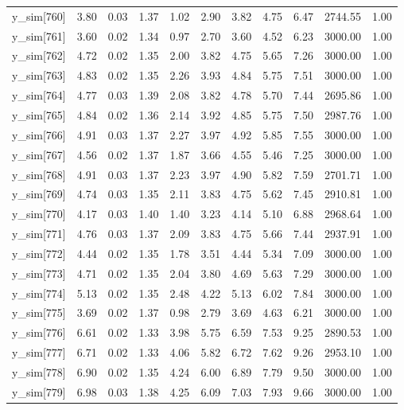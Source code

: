 \begin{table}[ht]
\begin{tabular}{rrrrrrrrrrr}
  y\_sim[760] & 3.80 & 0.03 & 1.37 & 1.02 & 2.90 & 3.82 & 4.75 & 6.47 & 2744.55 & 1.00 \\ 
  y\_sim[761] & 3.60 & 0.02 & 1.34 & 0.97 & 2.70 & 3.60 & 4.52 & 6.23 & 3000.00 & 1.00 \\ 
  y\_sim[762] & 4.72 & 0.02 & 1.35 & 2.00 & 3.82 & 4.75 & 5.65 & 7.26 & 3000.00 & 1.00 \\ 
  y\_sim[763] & 4.83 & 0.02 & 1.35 & 2.26 & 3.93 & 4.84 & 5.75 & 7.51 & 3000.00 & 1.00 \\ 
  y\_sim[764] & 4.77 & 0.03 & 1.39 & 2.08 & 3.82 & 4.78 & 5.70 & 7.44 & 2695.86 & 1.00 \\ 
  y\_sim[765] & 4.84 & 0.02 & 1.36 & 2.14 & 3.92 & 4.85 & 5.75 & 7.50 & 2987.76 & 1.00 \\ 
  y\_sim[766] & 4.91 & 0.03 & 1.37 & 2.27 & 3.97 & 4.92 & 5.85 & 7.55 & 3000.00 & 1.00 \\ 
  y\_sim[767] & 4.56 & 0.02 & 1.37 & 1.87 & 3.66 & 4.55 & 5.46 & 7.25 & 3000.00 & 1.00 \\ 
  y\_sim[768] & 4.91 & 0.03 & 1.37 & 2.23 & 3.97 & 4.90 & 5.82 & 7.59 & 2701.71 & 1.00 \\ 
  y\_sim[769] & 4.74 & 0.03 & 1.35 & 2.11 & 3.83 & 4.75 & 5.62 & 7.45 & 2910.81 & 1.00 \\ 
  y\_sim[770] & 4.17 & 0.03 & 1.40 & 1.40 & 3.23 & 4.14 & 5.10 & 6.88 & 2968.64 & 1.00 \\ 
  y\_sim[771] & 4.76 & 0.03 & 1.37 & 2.09 & 3.83 & 4.75 & 5.66 & 7.44 & 2937.91 & 1.00 \\ 
  y\_sim[772] & 4.44 & 0.02 & 1.35 & 1.78 & 3.51 & 4.44 & 5.34 & 7.09 & 3000.00 & 1.00 \\ 
  y\_sim[773] & 4.71 & 0.02 & 1.35 & 2.04 & 3.80 & 4.69 & 5.63 & 7.29 & 3000.00 & 1.00 \\ 
  y\_sim[774] & 5.13 & 0.02 & 1.35 & 2.48 & 4.22 & 5.13 & 6.02 & 7.84 & 3000.00 & 1.00 \\ 
  y\_sim[775] & 3.69 & 0.02 & 1.37 & 0.98 & 2.79 & 3.69 & 4.63 & 6.21 & 3000.00 & 1.00 \\ 
  y\_sim[776] & 6.61 & 0.02 & 1.33 & 3.98 & 5.75 & 6.59 & 7.53 & 9.25 & 2890.53 & 1.00 \\ 
  y\_sim[777] & 6.71 & 0.02 & 1.33 & 4.06 & 5.82 & 6.72 & 7.62 & 9.26 & 2953.10 & 1.00 \\ 
  y\_sim[778] & 6.90 & 0.02 & 1.35 & 4.24 & 6.00 & 6.89 & 7.79 & 9.50 & 3000.00 & 1.00 \\ 
  y\_sim[779] & 6.98 & 0.03 & 1.38 & 4.25 & 6.09 & 7.03 & 7.93 & 9.66 & 3000.00 & 1.00 \\ 

\end{tabular}
\end{table}
